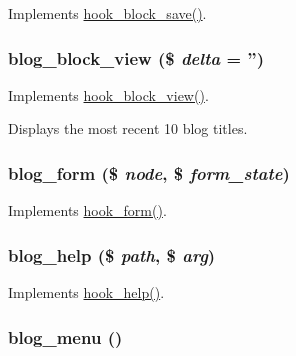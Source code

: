 \label{blog_8module_a7d6feb86f9fde964654130e26769181b}
Implements \hyperlink{group__hooks_ga622024ce4f818c241ca7a765e829f928}{hook\_\-block\_\-save()}. \hypertarget{blog_8module_a78b74d77d05f2ee6f6bf61d83909f7b6}{
\subsubsection[{blog\_\-block\_\-view}]{\setlength{\rightskip}{0pt plus 5cm}blog\_\-block\_\-view (\$ {\em delta} = {\ttfamily ''})}}
\label{blog_8module_a78b74d77d05f2ee6f6bf61d83909f7b6}
Implements \hyperlink{group__hooks_gaa14092a3e74cdc57aa295100cfd6860d}{hook\_\-block\_\-view()}.

Displays the most recent 10 blog titles. \hypertarget{blog_8module_aad8f1eac6b5325e01d681706f8786af4}{
\subsubsection[{blog\_\-form}]{\setlength{\rightskip}{0pt plus 5cm}blog\_\-form (\$ {\em node}, \/  \$ {\em form\_\-state})}}
\label{blog_8module_aad8f1eac6b5325e01d681706f8786af4}
Implements \hyperlink{group__node__api__hooks_ga52618ef4643a60878dd5a76ff9bbff30}{hook\_\-form()}. \hypertarget{blog_8module_a02fba16f89137e0e37363aa52e48efcc}{
\subsubsection[{blog\_\-help}]{\setlength{\rightskip}{0pt plus 5cm}blog\_\-help (\$ {\em path}, \/  \$ {\em arg})}}
\label{blog_8module_a02fba16f89137e0e37363aa52e48efcc}
Implements \hyperlink{group__hooks_ga5589c2714a782738e8851c4c90231f0e}{hook\_\-help()}. \hypertarget{blog_8module_aa58934e91c0c815986a6810d9ba15d26}{
\subsubsection[{blog\_\-menu}]{\setlength{\rightskip}{0pt plus 5cm}blog\_\-menu ()}}
\label{blog_8module_aa58934e91c0c815986a6810d9ba15d26}
